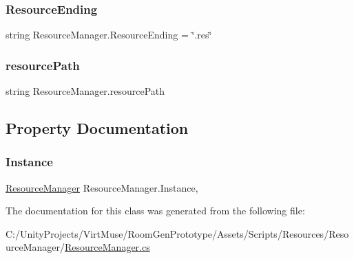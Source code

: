 \subsubsection{\texorpdfstring{Resource\+Ending}{ResourceEnding}}
{\footnotesize\ttfamily string Resource\+Manager.\+Resource\+Ending = \char`\"{}.res\char`\"{}\hspace{0.3cm}{\ttfamily [private]}}

\mbox{\label{class_resource_manager_a96bd19ebc1522ce7902e65246890b302}} 
\subsubsection{\texorpdfstring{resource\+Path}{resourcePath}}
{\footnotesize\ttfamily string Resource\+Manager.\+resource\+Path\hspace{0.3cm}{\ttfamily [private]}}



\subsection{Property Documentation}
\mbox{\label{class_resource_manager_a5980d46bdd1e2e1b4961ef63cc82d0cb}} 
\subsubsection{\texorpdfstring{Instance}{Instance}}
{\footnotesize\ttfamily \mbox{\hyperlink{class_resource_manager}{Resource\+Manager}} Resource\+Manager.\+Instance\hspace{0.3cm}{\ttfamily [static]}, {\ttfamily [get]}}



The documentation for this class was generated from the following file\+:\begin{DoxyCompactItemize}
\item 
C\+:/\+Unity\+Projects/\+Virt\+Muse/\+Room\+Gen\+Prototype/\+Assets/\+Scripts/\+Resources/\+Resource\+Manager/\mbox{\hyperlink{_resource_manager_8cs}{Resource\+Manager.\+cs}}\end{DoxyCompactItemize}
